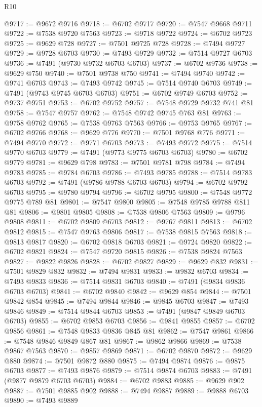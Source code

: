 \begin{lexlean}{R10}
\begin{coremodule}
{{{{{{{{{{{{{{{{{{{{{{{{{{{{{{{{{{{{{{{{{{{{{{{{{{{{{{{{{{{{{{{{{{{{{{{{{{{{{{{{{{{{@9717 := @9672 @9716
@9718 := @6702 @9717
@9720 := @7547 @9668 @9711
@9722 := @7538 @9720 @7563
@9723 := @9718 @9722
@9724 := @6702 @9723
@9725 := @9629 @728
@9727 := @7501 @9725 @728
@9728 := @7494 @9727
@9729 := @9728 @6703
@9730 := @7493 @9729
@9732 := @7514 @9727 @6703
@9736 := @7491 (@9730 @9732 @6703 @6703)
@9737 := @6702 @9736
@9738 := @9629 @750
@9740 := @7501 @9738 @750
@9741 := @7494 @9740
@9742 := @9741 @6703
@9743 := @7493 @9742
@9745 := @7514 @9740 @6703
@9749 := @7491 (@9743 @9745 @6703 @6703)
@9751 := @6702 @9749 @6703
@9752 := @9737 @9751
@9753 := @6702 @9752
@9757 := @7548 @9729 @9732 @741 @81
@9758 := @7547 @9757
@9762 := @7548 @9742 @9745 @763 @81
@9763 := @9758 @9762
@9765 := @7538 @9763 @7563
@9766 := @9753 @9765
@9767 := @6702 @9766
@9768 := @9629 @776
@9770 := @7501 @9768 @776
@9771 := @7494 @9770
@9772 := @9771 @6703
@9773 := @7493 @9772
@9775 := @7514 @9770 @6703
@9779 := @7491 (@9773 @9775 @6703 @6703)
@9780 := @6702 @9779
@9781 := @9629 @798
@9783 := @7501 @9781 @798
@9784 := @7494 @9783
@9785 := @9784 @6703
@9786 := @7493 @9785
@9788 := @7514 @9783 @6703
@9792 := @7491 (@9786 @9788 @6703 @6703)
@9794 := @6702 @9792 @6703
@9795 := @9780 @9794
@9796 := @6702 @9795
@9800 := @7548 @9772 @9775 @789 @81
@9801 := @7547 @9800
@9805 := @7548 @9785 @9788 @811 @81
@9806 := @9801 @9805
@9808 := @7538 @9806 @7563
@9809 := @9796 @9808
@9811 := @6702 @9809 @6703
@9812 := @9767 @9811
@9813 := @6702 @9812
@9815 := @7547 @9763 @9806
@9817 := @7538 @9815 @7563
@9818 := @9813 @9817
@9820 := @6702 @9818 @6703
@9821 := @9724 @9820
@9822 := @6702 @9821
@9824 := @7547 @9720 @9815
@9826 := @7538 @9824 @7563
@9827 := @9822 @9826
@9828 := @6702 @9827
@9829 := @9629 @832
@9831 := @7501 @9829 @832
@9832 := @7494 @9831
@9833 := @9832 @6703
@9834 := @7493 @9833
@9836 := @7514 @9831 @6703
@9840 := @7491 (@9834 @9836 @6703 @6703)
@9841 := @6702 @9840
@9842 := @9629 @854
@9844 := @7501 @9842 @854
@9845 := @7494 @9844
@9846 := @9845 @6703
@9847 := @7493 @9846
@9849 := @7514 @9844 @6703
@9853 := @7491 (@9847 @9849 @6703 @6703)
@9855 := @6702 @9853 @6703
@9856 := @9841 @9855
@9857 := @6702 @9856
@9861 := @7548 @9833 @9836 @845 @81
@9862 := @7547 @9861
@9866 := @7548 @9846 @9849 @867 @81
@9867 := @9862 @9866
@9869 := @7538 @9867 @7563
@9870 := @9857 @9869
@9871 := @6702 @9870
@9872 := @9629 @880
@9874 := @7501 @9872 @880
@9875 := @7494 @9874
@9876 := @9875 @6703
@9877 := @7493 @9876
@9879 := @7514 @9874 @6703
@9883 := @7491 (@9877 @9879 @6703 @6703)
@9884 := @6702 @9883
@9885 := @9629 @902
@9887 := @7501 @9885 @902
@9888 := @7494 @9887
@9889 := @9888 @6703
@9890 := @7493 @9889
}}}}}}}}}}}}}}}}}}}}}}}}}}}}}}}}}}}}}}}}}}}}}}}}}}}}}}}}}}}}}}}}}}}}}}}}}}}}}}}}}}}}
\end{coremodule}
\end{lexlean}

